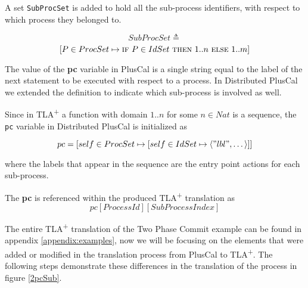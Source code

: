 \documentclass[journal]{IEEEtran}
\newcommand{\tlaplus}{TLA\textsuperscript{+}\xspace}
\newcommand{\IF}{\textsc{if}}
\newcommand{\THEN}{\textsc{then}}
\newcommand{\ELSE}{\textsc{else}}
\newcommand{\seq}[1]{\langle #1 \rangle}
\begin{document}
A set \verb|SubProcSet| is added to hold all the sub-process identifiers, with respect to which process they belonged to.

\[
SubProcSet \triangleq 
\]					
\[
[P \in ProcSet \mapsto \IF\ P \in IdSet\ \THEN\  1..n\ 
								\ELSE\  1..m ]
\]

The value of the \textbf{pc} variable in PlusCal is a single string equal to the label of the next statement to be executed with respect to a process. In Distributed PlusCal we extended the definition to indicate which sub-process is involved as well.

Since in \tlaplus a function with domain $1..n$ for some $n \in Nat$ is a sequence, the \verb|pc| variable in Distributed PlusCal is initialized as

\[
pc = [self \in ProcSet \mapsto [self \in IdSet \mapsto \seq{"lbl",\dots}]]
\]	

where the labels that appear in the sequence are the entry point actions for each sub-process. 

The \textbf{pc} is referenced within the produced \tlaplus translation as \[ pc[Process Id][SubProcess Index] \]
		  
The entire \tlaplus translation of the Two Phase Commit example can be found in appendix \ref{appendix:examples}, now we will be focusing on the elements that were added or modified in the translation process from PlusCal to \tlaplus. The following steps demonstrate these differences in the translation of the process in figure \ref{2pcSub}.
\end{document}
